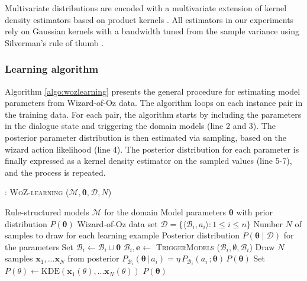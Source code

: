 Multivariate distributions are encoded with a multivariate extension of kernel density estimators based on product kernels \citep{Silverman1986}.  All estimators in our experiments rely on Gaussian kernels with a bandwidth tuned from the sample variance using Silverman's rule of thumb \citep{Silverman1986}. 


\subsubsection*{Learning algorithm}

Algorithm \ref{algo:wozlearning} presents the general procedure for estimating model parameters from Wizard-of-Oz data.  The algorithm loops on each instance pair in the training data.  For each pair, the algorithm starts by including the parameters in the dialogue state and triggering the domain models (line 2 and 3). The posterior parameter distribution is then estimated via sampling, based on the wizard action likelihood (line 4).  The posterior distribution for each parameter is finally expressed as a kernel density estimator on the sampled values (line 5-7), and the process is repeated. 

\begin{algorithm}[h!]
\caption{: \textsc{WoZ-learning} ($\mathcal{M}, \boldsymbol\theta, \mathcal{D}, N$)}
\begin{algorithmic}[1] \vspace{1mm}
\REQUIRE Rule-structured models $\mathcal{M}$ for the domain
\REQUIRE Model parameters $\boldsymbol\theta$ with prior distribution $P(\boldsymbol\theta)$
\REQUIRE Wizard-of-Oz data set $\mathcal{D} = \{\langle \mathcal{B}_i, a_i \rangle : 1 \leq i  \leq n\}$
\REQUIRE Number $N$ of samples to draw for each learning example
\ENSURE Posterior distribution $P(\boldsymbol\theta \; | \; \mathcal{D})$ for the parameters  \vspace{1mm}
\STATE Set $\mathcal{B}_i \leftarrow \mathcal{B}_i \cup \boldsymbol\theta$
\STATE $\mathcal{B}_i, \mathbf{e} \leftarrow$ \textsc{TriggerModels} ($\mathcal{B}_i, \emptyset,  \mathcal{B}_i$) 
\STATE Draw $N$ samples $\mathbf{x}_1,...\mathbf{x}_N$ from posterior $P_{\mathcal{B}_i}(\boldsymbol\theta \, | \, a_i) = \eta \, P_{\mathcal{B}_i}(a_i\,; \boldsymbol\theta) \, P(\boldsymbol\theta )$
\STATE Set $P(\theta) \leftarrow \mathrm{KDE}(\mathbf{x}_1(\theta),...\mathbf{x}_N(\theta))$
\ENDFOR
\ENDFOR
\RETURN $P(\boldsymbol\theta)$
\end{algorithmic}
\label{algo:wozlearning}
\end{algorithm}


